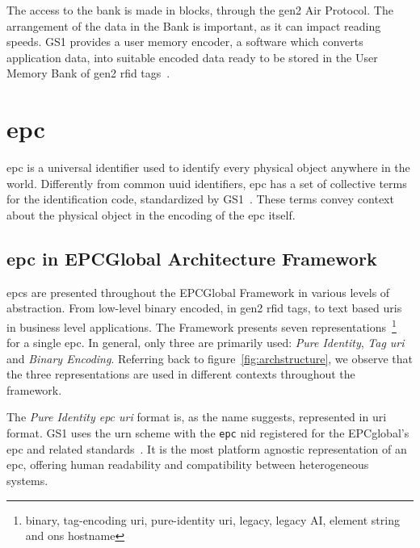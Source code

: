 The access to the bank is made in blocks, through the \ac{gen2} Air Protocol. The arrangement of the data in the Bank is important, as it can impact reading speeds.
GS1 provides a user memory encoder, a software which converts application data, into suitable encoded data ready to be stored in the User Memory Bank of \ac{gen2} \ac{rfid} tags~\cite{marco.santos.diamondFAQ2020}.

\section{\acf{epc}} \label{sec:epc}


\ac{epc} is a universal identifier used to identify every physical object anywhere in the world.
Differently from common \ac{uuid} identifiers, \ac{epc} has a set of collective terms for the identification code, standardized by GS1~\cite{GS1GeneralSpecifications}. These terms convey context about the physical object in the encoding of the \ac{epc} itself.

\subsection{\ac{epc} in EPCGlobal Architecture Framework}

\acp{epc} are presented throughout the EPCGlobal Framework in various levels of abstraction. From low-level binary encoded, in \ac{gen2} \ac{rfid} tags, to text based \acp{uri} in business level applications.
The Framework presents seven representations~\footnote{binary, tag-encoding \ac{uri}, pure-identity \ac{uri}, legacy, legacy AI, element string and \ac{ons} hostname} for a single \ac{epc}. In general, only three are primarily used: \emph{Pure Identity}, \emph{Tag \ac{uri}} and \emph{Binary Encoding}.
Referring back to figure~\ref{fig:archstructure}, we observe that the three representations are used in different contexts throughout the framework.

The \emph{Pure Identity \ac{epc} \ac{uri}} format is, as the name suggests, represented in \acf{uri} format.
GS1 uses the \ac{urn} scheme with the \texttt{epc} \ac{nid} registered for the EPCglobal's \ac{epc} and related standards~\cite{meallingUniformResourceName}.
It is the most platform agnostic representation of an \ac{epc}, offering human readability and compatibility between heterogeneous systems. 

